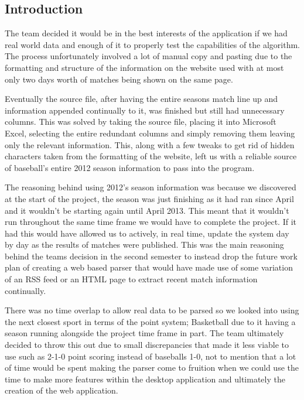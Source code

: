 \subsection{Introduction}

The team decided it would be in the best interests of the application if we had
real world data and enough of it to properly test the capabilities of the
algorithm. The process unfortunately involved a lot of manual copy and pasting
due to the formatting and structure of the information on the website used with
at most only two days worth of matches being shown on the same page.

Eventually the source file, after having the entire seasons match line up and
information appended continually to it, was finished but still had unnecessary
columns. This was solved by taking the source file, placing it into Microsoft
Excel, selecting the entire redundant columns and simply removing them leaving
only the relevant information. This, along with a few tweaks to get rid of
hidden characters taken from the formatting of the website, left us with a
reliable source of baseball's entire 2012 season information to pass into the
program.

The reasoning behind using 2012's season information was because we discovered
at the start of the project, the season was just finishing as it had ran since
April and it wouldn't be starting again until April 2013. This meant that it
wouldn't run throughout the same time frame we would have to complete the
project. If it had this would have allowed us to actively, in real time, update
the system day by day as the results of matches were published. This was the
main reasoning behind the teams decision in the second semester to instead drop
the future work plan of creating a web based parser that would have made use of
some variation of an RSS feed or an HTML page to extract recent match
information continually.

There was no time overlap to allow real data to be parsed so we looked into
using the next closest sport in terms of the point system; Basketball due to it
having a season running alongside the project time frame in part. The team
ultimately decided to throw this out due to small discrepancies that made it
less viable to use such as 2-1-0 point scoring instead of baseballs 1-0, not to
mention that a lot of time would be spent making the parser come to fruition
when we could use the time to make more features within the desktop application
and ultimately the creation of the web application.

